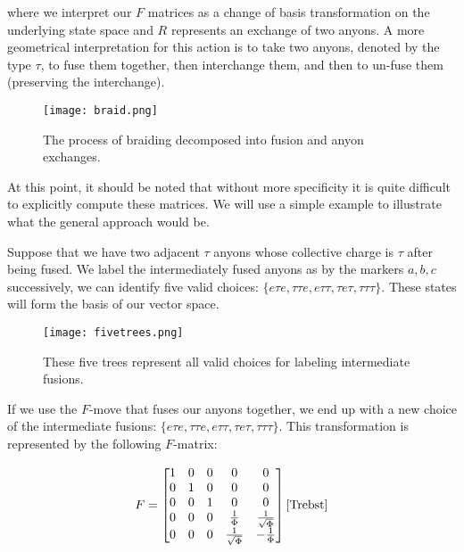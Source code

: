 where we interpret our $F$ matrices as a change of basis transformation on the underlying state space and $R$ represents an exchange of two anyons. A more geometrical interpretation for this action is to take two anyons, denoted by the type $\tau$, to fuse them together, then interchange them, and then to un-fuse them (preserving the interchange). 

\begin{figure}[H]
	\centering
	\texttt{[image: braid.png]}
	\caption{The process of braiding decomposed into fusion and anyon exchanges.}
\end{figure}

At this point, it should be noted that without more specificity it is quite difficult to explicitly compute these matrices. We will use a simple example to illustrate what the general approach would be.

\begin{example}
\end{example}
Suppose that we have two adjacent $\tau$ anyons whose collective charge is $\tau$ after being fused. We label the intermediately fused anyons as by the markers $a,b,c$ successively, we can identify five valid choices: $\{e\tau e,\tau\tau e, e\tau\tau, \tau e\tau, \tau\tau\tau\}$. These states will form the basis of our vector space.

\begin{figure}[H]
	\centering
	\texttt{[image: fivetrees.png]}
	\caption{These five trees represent all valid choices for labeling intermediate fusions.}
\end{figure}

If we use the $F$-move that fuses our anyons together, we end up with a new choice of the intermediate fusions: $\{e\tau e,\tau\tau e, e\tau\tau, \tau e\tau, \tau\tau\tau\}$. This transformation is represented by the following $F$-matrix:

\begin{equation}
	\begin{aligned}
		F = \begin{bmatrix}
				1 & 0 & 0 & 0 & 0 \\
				0 & 1 & 0 & 0 & 0 \\
				0 & 0 & 1 & 0 & 0 \\
				0 & 0 & 0 & \frac{1}{\Phi} & \frac{1}{\sqrt{\Phi}}\\
				0 & 0 & 0 &\frac{1}{\sqrt{\Phi}} & -\frac{1}{\Phi}
			\end{bmatrix}\cite{Trebst}
	\end{aligned}
\end{equation}


